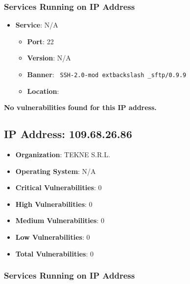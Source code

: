 \documentclass{article}
\begin{document}
\subsubsection*{Services Running on IP Address}

\begin{itemize}
    
        \item \textbf{Service}: N/A
        \begin{itemize}
            \item \textbf{Port}: 22
            \item \textbf{Version}:  N/A 
            \item \textbf{Banner}: \texttt{ SSH-2.0-mod	extbackslash _sftp/0.9.9 }
            \item \textbf{Location}: \href{  }{  }
        \end{itemize}
    
\end{itemize}


\textbf{No vulnerabilities found for this IP address.}


\clearpage



\subsection*{IP Address: 109.68.26.86}

\begin{itemize}
    \item \textbf{Organization}: TEKNE S.R.L.
    \item \textbf{Operating System}:  N/A 
    \item \textbf{Critical Vulnerabilities}: 0
    \item \textbf{High Vulnerabilities}: 0
    \item \textbf{Medium Vulnerabilities}: 0
    \item \textbf{Low Vulnerabilities}: 0
    \item \textbf{Total Vulnerabilities}: 0
\end{itemize}

\subsubsection*{Services Running on IP Address}
\end{document}
